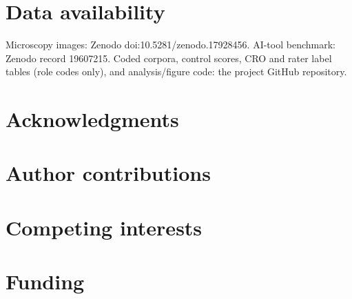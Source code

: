 \section*{Data availability}
Microscopy images: Zenodo doi:10.5281/zenodo.17928456. AI-tool benchmark: Zenodo record 19607215. Coded corpora, control scores, CRO and rater label tables (role codes only), and analysis/figure code: the project GitHub repository. 

\section*{Acknowledgments}

\section*{Author contributions}

\section*{Competing interests}

\section*{Funding}
